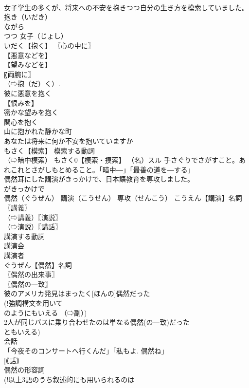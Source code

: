 \documentclass[8pt]{extreport}
\begin{document}
\begin{CJK}{UTF8}{min}
\\	女子学生の多くが、将来への不安を抱きつつ自分の生き方を模索していました。		抱き（いだき） 
\\	ながら 
\\	つつ 女子（じょし）
\\	いだく【抱く】 〖心の中に〗
\\	【悪意などを】
\\	【望みなどを】
\\	〖両腕に〗
\\	（⇨抱（だ）く）. 
\\	彼に悪意を抱く 
\\	【恨みを】
\\	密かな望みを抱く 
\\	関心を抱く 
\\	山に抱かれた静かな町 
\\	あなたは将来に何か不安を抱いていますか 
\\	もさく【模索】 模索する動詞 
\\	（⇨暗中模索） もさく0【模索・摸索】 （名）スル 手さぐりでさがすこと。あれこれとさがしもとめること。「暗中―」「最善の道を―する」
\\	偶然耳にした講演がきっかけで、日本語教育を専攻しました。		
\\	がきっかけで　
\\	偶然（ぐうぜん） 講演（こうせん） 専攻（せんこう） こうえん【講演】名詞 〖講義〗
\\	（⇨講義）〖演説〗
\\	（⇨演説）〖講話〗
\\	講演する動詞 
\\	講演会 
\\	講演者 
\\	ぐうぜん【偶然】名詞 
\\	〖偶然の出来事〗
\\	〖偶然の一致〗
\\	彼のアメリカ発見はまったく[ほんの]偶然だった 
\\	(!強調構文を用いて 
\\	のようにもいえる （⇨副）) 
\\	2人が同じバスに乗り合わせたのは単なる偶然(の一致)だった 
\\	ともいえる) 
\\	会話 
\\	「今夜そのコンサートへ行くんだ」「私もよ. 偶然ね」 
\\	[｟話｠ 
\\	偶然の形容詞 
\\	(!以上3語のうち叙述的にも用いられるのは 

\end{CJK}
\end{document}
